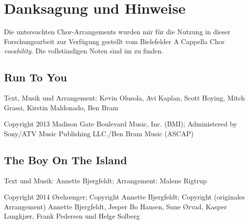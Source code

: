 \chapter*{Danksagung und Hinweise}
\label{chap:Danksagung und Hinweise}

Die untersuchten Chor-Arrangements wurden mir für die Nutzung in dieser Forschungsarbeit zur Verfügung gestellt vom Bielefelder A Cappella Chor \textit{vocability}. Die vollständigen Noten sind im  zu finden.

\section*{Run To You}

Text, Musik und Arrangement: Kevin Olusola, Avi Kaplan, Scott Hoying, Mitch Grassi, Kirstin Maldonado, Ben Bram

Copyright 2013 Madison Gate Boulevard Music, Inc. (BMI); Administered by Sony/ATV Music Publishing LLC./Ben Bram Music (ASCAP)

\section*{The Boy On The Island}

Text und Musik: Annette Bjergfeldt; Arrangement: Malene Rigtrup

Copyright 2014 Ørehœnger; Copyright Annette Bjergfeldt; Copyright (originales Arrangement) Annette Bjergfeldt, Jesper Bo Hansen, Sune Ørvad, Kasper Langkjær, Frank Pedersen und Helge Solberg